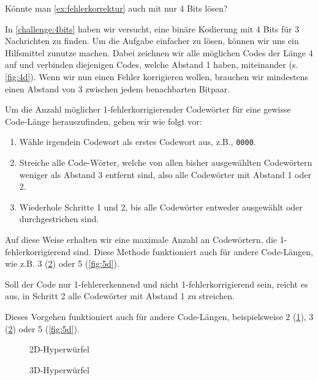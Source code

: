 \begin{mychallenge}\label{challenge:4bits}
    Könnte man \cref{ex:fehlerkorrektur} auch mit nur 4 Bits lösen?
\end{mychallenge}


In \cref{challenge:4bits} haben wir versucht, eine binäre Kodierung mit 4 Bits für 3 Nachrichten zu finden. Um die Aufgabe einfacher zu lösen, können wir uns ein Hilfsmittel zunutze machen. Dabei zeichnen wir alle möglichen Codes der Länge 4 auf und verbinden diejenigen Codes, welche Abstand 1 haben, miteinander (s. \cref{fig:4d}). Wenn wir nun einen Fehler korrigieren wollen, brauchen wir mindestens einen Abstand von 3 zwischen jedem benachbarten Bitpaar.

\begin{mydefinition}
Um die Anzahl möglicher 1-fehlerkorrigierender Codewörter für eine gewisse Code-Länge herauszufinden, gehen wir wie folgt vor:
\begin{enumerate}
    \item Wähle irgendein Codewort als erstes Codewort aus, z.B., \texttt{0000}.
    \item Streiche alle Code-Wörter, welche von allen bisher ausgewählten Codewörtern weniger als Abstand 3 entfernt sind, also alle Codewörter mit Abstand 1 oder 2.
    \item Wiederhole Schritte 1 und 2, bis alle Codewörter entweder ausgewählt oder durchgestrichen sind.
\end{enumerate}
Auf diese Weise erhalten wir eine maximale Anzahl an Codewörtern, die 1-fehlerkorrigierend sind. Diese Methode funktioniert auch für andere Code-Längen, wie z.B. 3 (\cref{fig:3d}) oder 5 (\cref{fig:5d}).

Soll der Code nur 1-fehlererkennend und nicht 1-fehlerkorrigierend sein, reicht es aus, in Schritt 2 alle Codewörter mit Abstand 1 zu streichen.

Dieses Vorgehen funktioniert auch für andere Code-Längen, beispielsweise 2 (\cref{fig:2d}), 3 (\cref{fig:3d}) oder 5 (\cref{fig:5d}).
\end{mydefinition}

\begin{figure}[H]
    \centering
    \caption{2D-Hyperwürfel}
    \label{fig:2d}
\end{figure}

\begin{figure}[H]
    \centering
    \caption{3D-Hyperwürfel}
    \label{fig:3d}
\end{figure}

